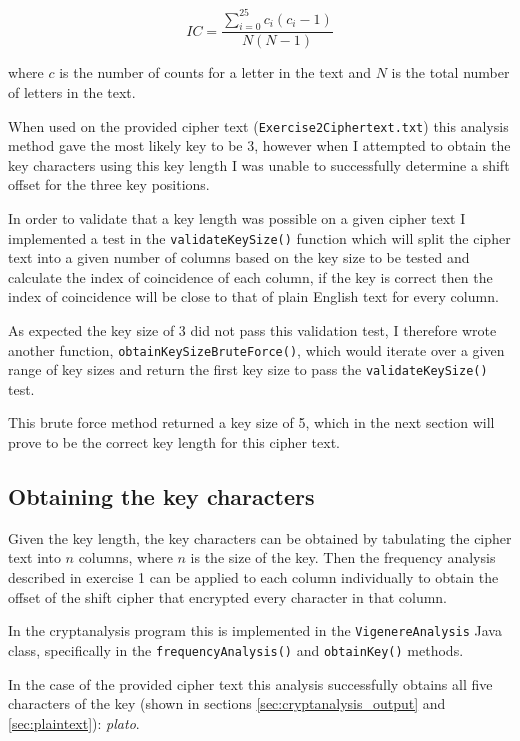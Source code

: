 \documentclass[a4paper]{article}
\begin{document}
\begin{equation}
  IC = \frac{\sum_{i = 0}^{25} c_{i} \left(c_{i} - 1\right)}{N \left(N - 1\right)}
  \label{eq:ioc}
\end{equation}
\FloatBarrier

where $c$ is the number of counts for a letter in the text and $N$ is the total
number of letters in the text.

When used on the provided cipher text (\texttt{Exercise2Ciphertext.txt}) this
analysis method gave the most likely key to be 3, however when I attempted to
obtain the key characters using this key length I was unable to successfully
determine a shift offset for the three key positions.

In order to validate that a key length was possible on a given cipher text I
implemented a test in the \texttt{validateKeySize()} function which will split
the cipher text into a given number of columns based on the key size to be
tested and calculate the index of coincidence of each column, if the key is
correct then the index of coincidence will be close to that of plain English
text for every column.

As expected the key size of 3 did not pass this validation test, I therefore
wrote another function, \texttt{obtainKeySizeBruteForce()}, which would iterate
over a given range of key sizes and return the first key size to pass the
\texttt{validateKeySize()} test.

This brute force method returned a key size of 5, which in the next section will
prove to be the correct key length for this cipher text.

\subsection{Obtaining the key characters}

Given the key length, the key characters can be obtained by tabulating the
cipher text into $n$ columns, where $n$ is the size of the key. Then the
frequency analysis described in exercise 1 can be applied to each column
individually to obtain the offset of the shift cipher that encrypted every
character in that column.

In the cryptanalysis program this is implemented in the
\texttt{VigenereAnalysis} Java class, specifically in the
\texttt{frequencyAnalysis()} and \texttt{obtainKey()} methods.

In the case of the provided cipher text this analysis successfully obtains all
five characters of the key (shown in sections \ref{sec:cryptanalysis_output} and
\ref{sec:plaintext}): \textit{plato}.
\end{document}
